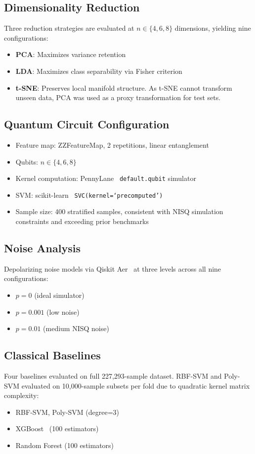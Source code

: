\documentclass[journal]{IEEEtran}
\begin{document}
\subsection{Dimensionality Reduction}
Three reduction strategies are evaluated at 
$n \in \{4, 6, 8\}$ dimensions, yielding nine configurations:
\begin{itemize}
    \item \textbf{PCA}: Maximizes variance retention
    \item \textbf{LDA}: Maximizes class separability 
    via Fisher criterion
    \item \textbf{t-SNE}: Preserves local manifold structure. 
    As t-SNE cannot transform unseen data, PCA was used as 
    a proxy transformation for test sets.
\end{itemize}

\subsection{Quantum Circuit Configuration}
\begin{itemize}
    \item Feature map: ZZFeatureMap, 2 repetitions, 
    linear entanglement
    \item Qubits: $n \in \{4, 6, 8\}$
    \item Kernel computation: PennyLane~\cite{pennylane2018} 
    \texttt{default.qubit} simulator
    \item SVM: scikit-learn~\cite{sklearn2011} 
    \texttt{SVC(kernel=`precomputed')}
    \item Sample size: 400 stratified samples, consistent 
    with NISQ simulation constraints and exceeding prior 
    benchmarks~\cite{havlicek2019,kakavand2026}
\end{itemize}

\subsection{Noise Analysis}
Depolarizing noise models via Qiskit Aer~\cite{qiskit2023} 
at three levels across all nine configurations:
\begin{itemize}
    \item $p = 0$ (ideal simulator)
    \item $p = 0.001$ (low noise)
    \item $p = 0.01$ (medium NISQ noise)
\end{itemize}

\subsection{Classical Baselines}
Four baselines evaluated on full 227,293-sample dataset. 
RBF-SVM and Poly-SVM evaluated on 10,000-sample subsets 
per fold due to quadratic kernel matrix complexity:
\begin{itemize}
    \item RBF-SVM, Poly-SVM (degree=3)
    \item XGBoost~\cite{chen2016xgboost} (100 estimators)
    \item Random Forest (100 estimators)
\end{itemize}
\end{document}
